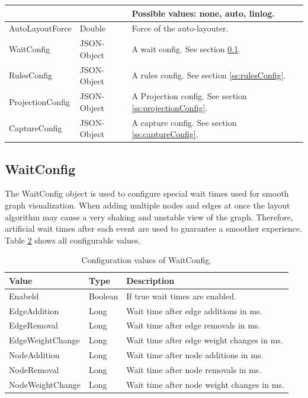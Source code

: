 \begin{table}[h]
\begin{tabular}[h]{|l|l|l|}
	& & Possible values: none, auto, linlog.\\
	\hline
	AutoLayoutForce & Double & Force of the auto-layouter.\\
	\hline
	WaitConfig & JSON-Object & A wait config. See section \ref{ss:waitConfig}.\\
	\hline
	RulesConfig & JSON-Object & A rules config. See section \ref{ss:rulesConfig}.\\
	\hline
	ProjectionConfig & JSON-Object & A Projection config. See section \ref{ss:projectionConfig}.\\
	\hline
	CaptureConfig & JSON-Object & A capture config. See section \ref{ss:captureConfig}.\\
	\hline
\end{tabular}
\label{tab:graphPanelConfigValues}
\end{table}

\subsection{WaitConfig}
\label{ss:waitConfig}
The WaitConfig object is used to configure special wait times used for smooth graph visualization. When adding multiple nodes and edges at once the layout algorithm may cause a very shaking and unstable view of the graph. Therefore, artificial wait times after each event are used to guarantee a smoother experience. Table \ref{tab:waitConfigValues} shows all configurable values.

\begin{table}[h]
\caption{Configuration values of WaitConfig.}
\centering
\begin{tabular}[h]{|l|l|l|}\hline
	\textbf{Value} & \textbf{Type} & \textbf{Description}\\
	\hline
	Enabeld & Boolean & If true wait times are enabled.\\
	\hline
	EdgeAddition & Long & Wait time after edge additions in ms.\\
	\hline
	EdgeRemoval & Long & Wait time after edge removals in ms.\\
	\hline
	EdgeWeightChange & Long & Wait time after edge weight changes in ms.\\
	\hline
	NodeAddition & Long & Wait time after node additions in ms.\\
	\hline
	NodeRemoval & Long & Wait time after node removals in ms.\\
	\hline
	NodeWeightChange & Long & Wait time after node weight changes in ms.\\
	\hline
\end{tabular}
\label{tab:waitConfigValues}
\end{table}

